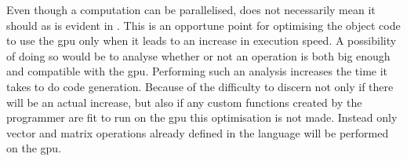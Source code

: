 Even though a computation can be parallelised, does not necessarily mean it should as is evident in .
This is an opportune point for optimising the object code to use the \acrshort{gpu} only when it leads to an increase in execution speed.
A possibility of doing so would be to analyse whether or not an operation is both big enough and compatible with the \acrshort{gpu}.
Performing such an analysis increases the time it takes to do code generation.
Because of the difficulty to discern not only if there will be an actual increase, but also if any custom functions created by the programmer are fit to run on the \acrshort{gpu} this optimisation is not made.
Instead only vector and matrix operations already defined in the language will be performed on the \acrshort{gpu}.


